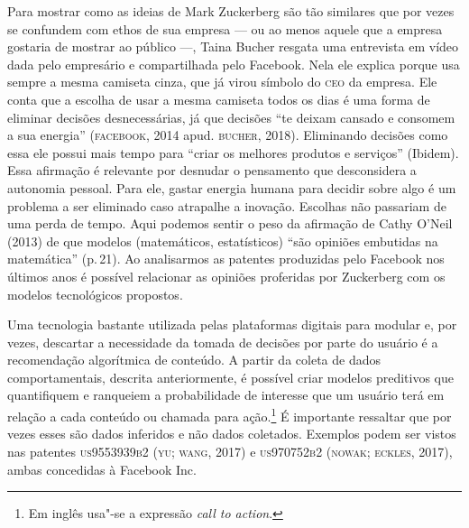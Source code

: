 Para mostrar como as ideias de Mark Zuckerberg são tão similares que por
vezes se confundem com ethos de sua empresa --- ou ao menos aquele que a
empresa gostaria de mostrar ao público ---, Taina Bucher resgata uma
entrevista em vídeo dada pelo empresário e compartilhada pelo Facebook.
Nela ele explica porque usa sempre a mesma camiseta cinza, que já virou
símbolo do \textsc{ceo} da empresa. Ele conta que a escolha de usar a mesma
camiseta todos os dias é uma forma de eliminar decisões desnecessárias,
já que decisões ``te deixam cansado e consomem a sua energia''
(\textsc{facebook}, 2014 apud. \textsc{bucher}, 2018). Eliminando decisões como essa ele
possui mais tempo para ``criar os melhores produtos e serviços''
(Ibidem). Essa afirmação é relevante por desnudar o pensamento que
desconsidera a autonomia pessoal. Para ele, gastar energia humana para
decidir sobre algo é um problema a ser eliminado caso atrapalhe a
inovação. Escolhas não passariam de uma perda de tempo. Aqui podemos
sentir o peso da afirmação de Cathy O'Neil (2013) de que modelos
(matemáticos, estatísticos) ``são opiniões embutidas na
matemática'' (p.\,21). Ao analisarmos as patentes produzidas pelo
Facebook nos últimos anos é possível relacionar as opiniões proferidas
por Zuckerberg com os modelos tecnológicos propostos.

Uma tecnologia bastante utilizada pelas plataformas digitais para
modular e, por vezes, descartar a necessidade da tomada de decisões por
parte do usuário é a recomendação algorítmica de conteúdo. A partir da
coleta de dados comportamentais, descrita anteriormente, é possível
criar modelos preditivos que quantifiquem e ranqueiem a probabilidade de
interesse que um usuário terá em relação a cada conteúdo ou chamada para
ação.\footnote{Em inglês usa"-se a expressão \textit{call to action}.} É
importante ressaltar que por vezes esses são dados inferidos e não dados
coletados. Exemplos podem ser vistos nas patentes \textsc{us9553939b2} (\textsc{yu; wang},
2017) e \textsc{us970752b2} (\textsc{nowak; eckles}, 2017), ambas concedidas à Facebook
Inc.

